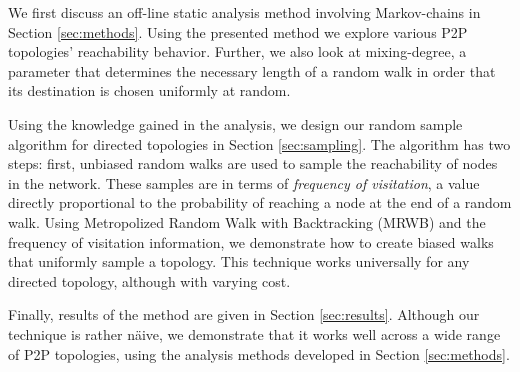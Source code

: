 We first discuss an off-line static analysis method involving Markov-chains in
Section \ref{sec:methods}.  Using the presented method we explore various P2P
topologies' reachability behavior.  Further, we also look at mixing-degree, a
parameter that determines the necessary length of a random walk in order that
its destination is chosen uniformly at random. 

Using the knowledge gained in the analysis, we design our random sample
algorithm for directed topologies in Section \ref{sec:sampling}.  The algorithm
has two steps: first, unbiased random walks are used to sample the reachability
of nodes in the network.  These samples are in terms of \emph{frequency of
visitation}, a value directly proportional to the probability of reaching a
node at the end of a random walk.  Using Metropolized Random Walk with
Backtracking (MRWB) \cite{stutzbach:imc06} and the frequency of visitation
information, we demonstrate how to create biased walks that uniformly sample
a topology.  This technique works universally for any directed topology,
although with varying cost.

Finally, results of the method are given in Section \ref{sec:results}.  Although
our technique is rather n\"{a}ive, we demonstrate that it works well across a
wide range of P2P topologies, using the analysis methods developed in Section
\ref{sec:methods}. 
